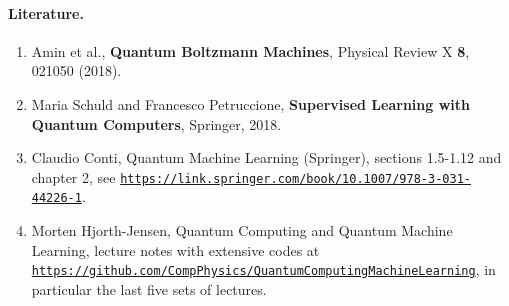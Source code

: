 \documentclass[%
oneside,                 %
final,                   %
10pt]{article}
\begin{document}
\paragraph{Literature.}
\begin{enumerate}
\item Amin et al., \textbf{Quantum Boltzmann Machines}, Physical Review X \textbf{8}, 021050 (2018).

\item Maria Schuld and Francesco Petruccione, \textbf{Supervised Learning with Quantum Computers}, Springer, 2018.

\item Claudio Conti, Quantum Machine Learning (Springer), sections 1.5-1.12 and chapter 2, see \href{{https://link.springer.com/book/10.1007/978-3-031-44226-1}}{\nolinkurl{https://link.springer.com/book/10.1007/978-3-031-44226-1}}.

\item Morten Hjorth-Jensen, Quantum Computing and Quantum Machine Learning, lecture notes with extensive codes at \href{{https://github.com/CompPhysics/QuantumComputingMachineLearning}}{\nolinkurl{https://github.com/CompPhysics/QuantumComputingMachineLearning}}, in particular the last five sets of lectures.
\end{enumerate}

\noindent

\end{document}
